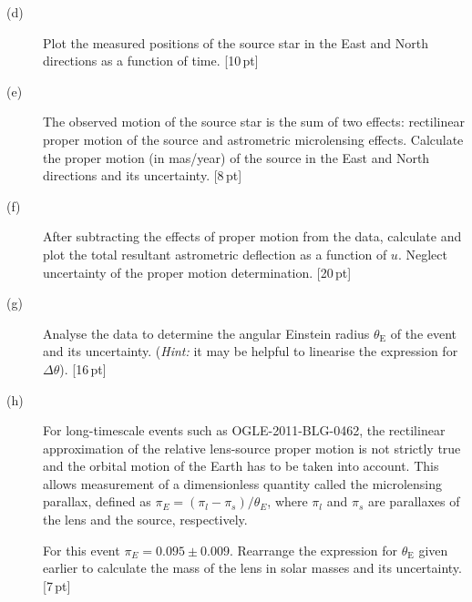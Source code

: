 \begin{description}
\item[(d)] Plot the measured positions of the source star in the East and
  North directions as a function of time. \hfill[10\,pt]
\item[(e)] The observed motion of the source star is the sum of two effects:
  rectilinear proper motion of the source and astrometric microlensing
  effects. Calculate the proper motion (in mas/year) of the source in the East
  and North directions and its uncertainty. \hfill[8\,pt]
\item[(f)] After subtracting the effects of proper motion from the data,
  calculate and plot the total resultant astrometric deflection as a function
  of $u$. Neglect uncertainty of the proper motion determination.
  \hfill[20\,pt]
\item[(g)] Analyse the data to determine the angular Einstein radius
  $\theta_{\mathrm{E}}$ of the event and its uncertainty. (\textit{Hint:} it
  may be helpful to linearise the expression for $\Delta\theta$).
  \hfill[16\,pt]
\item[(h)] For long-timescale events such as OGLE-2011-BLG-0462, the
  rectilinear approximation of the relative lens-source proper motion is not
  strictly true and the orbital motion of the Earth has to be taken into
  account. This allows measurement of a dimensionless quantity called the
  microlensing parallax, defined as
  $\pi_E = (\pi_l - \pi_s)/\theta_E$, where $\pi_l$ and $\pi_s$ are parallaxes
  of the lens and the source, respectively.

  For this event $\pi_E = 0.095 \pm 0.009$. Rearrange the expression for
  $\theta_{\mathrm{E}}$ given earlier to calculate the mass of the lens in
  solar masses and its uncertainty. \hfill[7\,pt]
\end{description}

